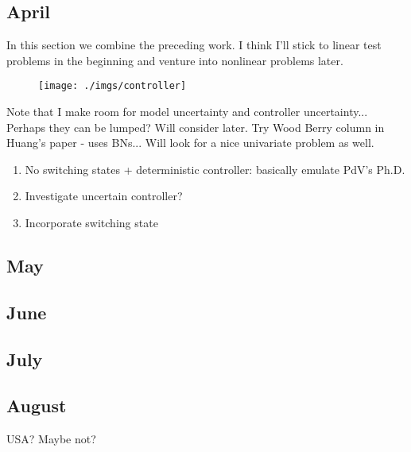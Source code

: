 \documentclass[11pt,fleqn]{article}
\begin{document}
\subsection{April}
In this section we combine the preceding work. I think I'll stick to linear test problems in the beginning and venture into nonlinear problems later. 
\begin{figure}[H] 
\centering
\texttt{[image: ./imgs/controller]}
\label{fig_cont_u}
\end{figure}
Note that I make room for model uncertainty and controller uncertainty... Perhaps they can be lumped? Will consider later. Try Wood Berry column in Huang's paper - uses BNs... Will look for a nice univariate problem as well.
\begin{enumerate}
\item
No switching states + deterministic controller: basically emulate PdV's Ph.D.
\item
Investigate uncertain controller? 
\item
Incorporate switching state
\end{enumerate}

\subsection{May}

\subsection{June}

\subsection{July}

\subsection{August}
USA? Maybe not?
\end{document}
